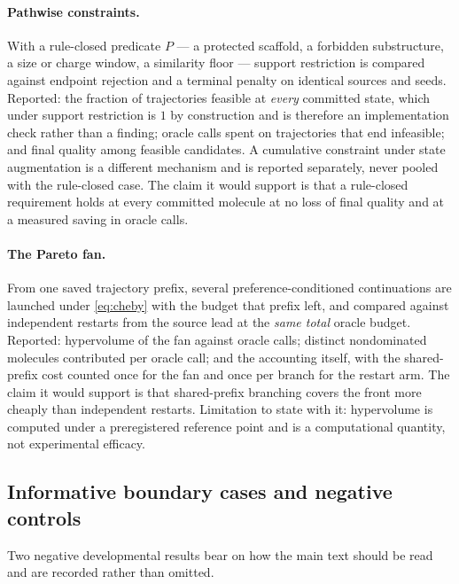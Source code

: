 \paragraph{Pathwise constraints.}
With a rule-closed predicate $P$ --- a protected scaffold, a forbidden substructure, a size or charge window, a similarity floor --- support restriction is compared against endpoint rejection and a terminal penalty on identical sources and seeds.
Reported: the fraction of trajectories feasible at \emph{every} committed state, which under support restriction is $1$ by construction and is therefore an implementation check rather than a finding; oracle calls spent on trajectories that end infeasible; and final quality among feasible candidates.
A cumulative constraint under state augmentation is a different mechanism and is reported separately, never pooled with the rule-closed case.
The claim it would support is that a rule-closed requirement holds at every committed molecule at no loss of final quality and at a measured saving in oracle calls.

\paragraph{The Pareto fan.}
From one saved trajectory prefix, several preference-conditioned continuations are launched under \eqref{eq:cheby} with the budget that prefix left, and compared against independent restarts from the source lead at the \emph{same total} oracle budget.
Reported: hypervolume of the fan against oracle calls; distinct nondominated molecules contributed per oracle call; and the accounting itself, with the shared-prefix cost counted once for the fan and once per branch for the restart arm.
The claim it would support is that shared-prefix branching covers the front more cheaply than independent restarts.
Limitation to state with it: hypervolume is computed under a preregistered reference point and is a computational quantity, not experimental efficacy.

\subsection{Informative boundary cases and negative controls}
\label{app:negatives}

Two negative developmental results bear on how the main text should be read and are recorded rather than omitted.

